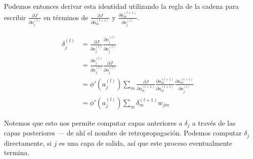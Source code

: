 Podemos entonces derivar esta identidad utilizando la regla de la cadena
para escribir $\frac{\partial J}{\partial o_j^{(l)}}$ en términos de
$\frac{\partial J}{\partial a_m^{(l+1)}}$ y $\frac{\partial a_m^{(l+1)}}{\partial o_j^{(l)}}$.

\begin{equation}
\begin{split}
  \delta_j^{(l)} &= \frac{\partial J}{\partial o_j^{(l)}} \frac{\partial o_j^{(l)}}{\partial a_j^{(l)}} \\
  &= \frac{\partial o_j^{(l)}}{\partial a_j^{(l)}} \frac{\partial J}{\partial o_j^{(l)}} \\
  &= \phi' (a_j^{(l)}) \sum_m \frac{\partial J}{\partial o_m^{(l+1)}} \frac{\partial o_m^{(l+1)}}{\partial a_m^{(l+1)}} \frac{\partial a_m^{(l+1)}}{\partial o_j^{(l)}} \\
  &= \phi'(a_j^{(l)}) \sum_m \delta_m^{(l+1)}w_{jm}
\end{split}
\end{equation}

Notemos que esto nos permite computar capas anteriores a $\delta_j$ a
través de las capas posteriores --- de ahí el nombre de retropropagación.
Podemos computar $\delta_j$ directamente, si $j$ es una capa de salida,
así que este proceso eventualmente termina.

